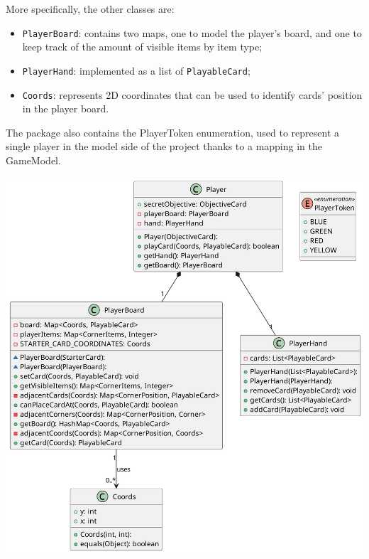 \documentclass{article}
\begin{document}
\noindent
More specifically, the other classes are:
\begin{itemize}
    \item \texttt{PlayerBoard}: contains two maps, one to model the player's board, and one to keep track of the amount of visible items by item type;
    \item \texttt{PlayerHand}: implemented as a list of \texttt{PlayableCard};
    \item \texttt{Coords}: represents 2D coordinates that can be used to identify cards' position in the player board.
\end{itemize}
\noindent
The package also contains the PlayerToken enumeration, used to represent a single player in the model side of the project thanks to a mapping in the GameModel.

\vspace{0.2cm}
\begin{center}
    \hspace*{-2cm}\includegraphics[scale=0.1]{pngs/player}
\end{center}
\end{document}
